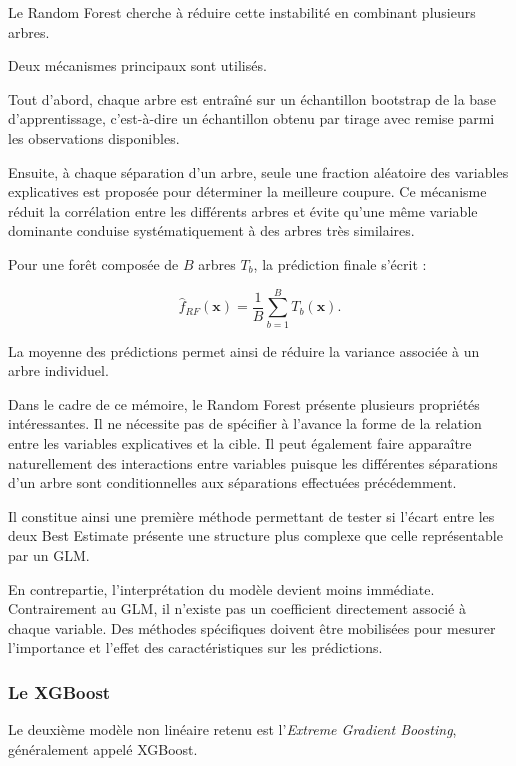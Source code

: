 Le Random Forest cherche à réduire cette instabilité en combinant plusieurs arbres.

Deux mécanismes principaux sont utilisés.

Tout d'abord, chaque arbre est entraîné sur un échantillon bootstrap de la base d'apprentissage, c'est-à-dire un échantillon obtenu par tirage avec remise parmi les observations disponibles.

Ensuite, à chaque séparation d'un arbre, seule une fraction aléatoire des variables explicatives est proposée pour déterminer la meilleure coupure. Ce mécanisme réduit la corrélation entre les différents arbres et évite qu'une même variable dominante conduise systématiquement à des arbres très similaires.

Pour une forêt composée de $B$ arbres $T_b$, la prédiction finale s'écrit :

\begin{equation}
    \widehat{f}_{RF}(\mathbf{x})
    =
    \frac{1}{B}
    \sum_{b=1}^{B}
    T_b(\mathbf{x}).
    \label{eq:rf}
\end{equation}

La moyenne des prédictions permet ainsi de réduire la variance associée à un arbre individuel.

Dans le cadre de ce mémoire, le Random Forest présente plusieurs propriétés intéressantes. Il ne nécessite pas de spécifier à l'avance la forme de la relation entre les variables explicatives et la cible. Il peut également faire apparaître naturellement des interactions entre variables puisque les différentes séparations d'un arbre sont conditionnelles aux séparations effectuées précédemment.

Il constitue ainsi une première méthode permettant de tester si l'écart entre les deux Best Estimate présente une structure plus complexe que celle représentable par un GLM.

En contrepartie, l'interprétation du modèle devient moins immédiate. Contrairement au GLM, il n'existe pas un coefficient directement associé à chaque variable. Des méthodes spécifiques doivent être mobilisées pour mesurer l'importance et l'effet des caractéristiques sur les prédictions.


\subsubsection{Le XGBoost}

Le deuxième modèle non linéaire retenu est l'\textit{Extreme Gradient Boosting}, généralement appelé XGBoost.

